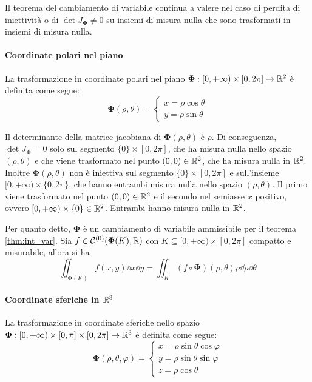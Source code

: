 \begin{remark}
    Il teorema del cambiamento di variabile continua a valere nel caso di perdita di iniettività o di $\det J_{\bm\Phi}\neq 0$ su insiemi di misura nulla che sono trasformati in insiemi di misura nulla.
\end{remark}

\paragraph{Coordinate polari nel piano}
La trasformazione in coordinate polari nel piano $\bm\Phi:[0,+\infty)\times[0,2\pi]\to\mathbb{R}^2$ è definita come segue:
$$\bm\Phi(\rho,\theta)=
\begin{cases}
    x=\rho \cos \theta\\
    y=\rho \sin \theta
\end{cases}
$$

Il determinante della matrice jacobiana di $\bm\Phi(\rho,\theta)$ è $\rho$. Di conseguenza, $\det J_{\bm\Phi}=0$ solo sul segmento $\{0\}\times[0,2\pi]$, che ha misura nulla nello spazio $(\rho,\theta)$ e che viene trasformato nel punto $(0,0)\in\mathbb{R}^2$, che ha misura nulla in $\mathbb{R}^2$.
Inoltre $\bm\Phi(\rho,\theta)$ non è iniettiva sul segmento $\{0\}\times[0,2\pi]$ e sull'insieme $[0,+\infty)\times\{0,2\pi\}$, che hanno entrambi misura nulla nello spazio $(\rho,\theta)$. Il primo viene trasformato nel punto $(0,0)\in\mathbb{R}^2$ e il secondo nel semiasse $x$ positivo, ovvero $[0,+\infty)\times\{0\} \in \mathbb{R}^2$. Entrambi hanno misura nulla in $\mathbb{R}^2$.

Per quanto detto, $\bm\Phi$ è un cambiamento di variabile ammissibile per il teorema \ref{thm:int_var}. Sia $f\in \mathcal{C}^{(0)}(\bm\Phi(K),\mathbb{R})$ con $K\subseteq[0,+\infty)\times[0,2\pi]$ compatto e misurabile, allora si ha
$$\iint_{\bm\Phi(K)} f(x,y)\dd x \dd y=\iint_K (f\circ \bm\Phi)(\rho,\theta)\rho\dd \rho \dd \theta$$

\paragraph{Coordinate sferiche in $\mathbb{R}^3$}
La trasformazione in coordinate sferiche nello spazio $\bm\Phi:[0,+\infty)\times[0,\pi]\times[0,2\pi] \to \mathbb{R}^3$ è definita come segue:
$$
\bm\Phi(\rho,\theta,\varphi)=
\begin{cases}
    x=\rho\sin\theta\cos\varphi\\
    y=\rho\sin\theta\sin\varphi\\
    z=\rho\cos\theta
\end{cases}
$$

